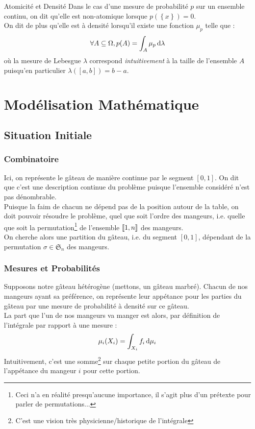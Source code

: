 \documentclass{cours}
\begin{document}
\begin{définition}{Atomicité et Densité}{}
Dans le cas d'une mesure de probabilité $p$ sur un ensemble continu, on dit qu'elle est non-atomique lorsque $p(\left\{x\right\}) = 0$.\\
On dit de plus qu'elle est à densité lorsqu'il existe une fonction $\mu_{p}$ telle que\! :
\[
    \forall A \subseteq \Omega, p(A) = \int_{A} \mu_{p} {\rm \, d}\lambda
\]
où la mesure de Lebesgue $\lambda$ correspond \textit{intuitivement} à la taille de l'ensemble $A$ puisqu'en particulier $\lambda(\left[a, b\right]) = b - a$.
\end{définition}

\section{Modélisation Mathématique}
\subsection{Situation Initiale}
\subsubsection{Combinatoire}
Ici, on représente le gâteau de manière continue par le segment $\left[0, 1\right]$. On dit que c'est une description continue du problème puisque l'ensemble considéré n'est pas dénombrable.\\
Puisque la faim de chacun ne dépend pas de la position autour de la table, on doit pouvoir résoudre le problème, quel que soit l'ordre des mangeurs, i.e. quelle que soit la permutation\footnote{Ceci n'a en réalité presqu'aucune importance, il s'agit plus d'un prétexte pour parler de permutations...} de l'ensemble $\left\llbracket 1, n\right\rrbracket$ des mangeurs. \\
On cherche alors une partition du gâteau, i.e. du segment $\left[0, 1\right]$, dépendant de la permutation $\sigma \in \mathfrak{S}_{n}$ des mangeurs.

\subsubsection{Mesures et Probabilités}
Supposons notre gâteau hétérogène (mettons, un gâteau marbré). Chacun de nos mangeurs ayant sa préférence, on représente leur appétance pour les parties du gâteau par une mesure de probabilité à densité sur ce gâteau.\\
La part que l'un de nos mangeurs va manger est alors, par définition de l'intégrale par rapport à une mesure\! :
\[
    \mu_{i}(X_{i}) = \int_{X_{i}}f_{i} {\rm \, d}\mu_{i}
\]
Intuitivement, c'est une somme\footnote{C'est une vision très physicienne/historique de l'intégrale} sur chaque petite portion du gâteau de l'appétance du mangeur $i$ pour cette portion.
\end{document}
